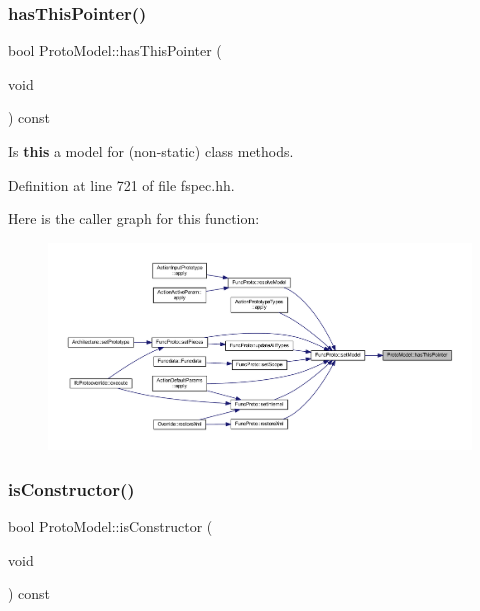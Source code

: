 \subsubsection{\texorpdfstring{hasThisPointer()}{hasThisPointer()}}
{\footnotesize\ttfamily bool Proto\+Model\+::has\+This\+Pointer (\begin{DoxyParamCaption}\item[{void}]{ }\end{DoxyParamCaption}) const\hspace{0.3cm}{\ttfamily [inline]}}



Is {\bfseries{this}} a model for (non-\/static) class methods. 



Definition at line 721 of file fspec.\+hh.

Here is the caller graph for this function\+:
\nopagebreak
\begin{figure}[H]
\begin{center}
\leavevmode
\includegraphics[width=350pt]{class_proto_model_aace107c2668bbd0091159f5c9e5a9042_icgraph}
\end{center}
\end{figure}
\mbox{\label{class_proto_model_a8699b4b61ebc7565dbfd7ec7ab600eca}} 
\subsubsection{\texorpdfstring{isConstructor()}{isConstructor()}}
{\footnotesize\ttfamily bool Proto\+Model\+::is\+Constructor (\begin{DoxyParamCaption}\item[{void}]{ }\end{DoxyParamCaption}) const\hspace{0.3cm}{\ttfamily [inline]}}



